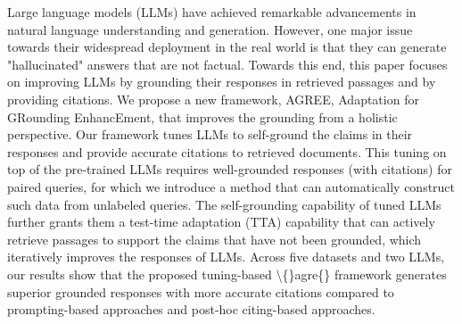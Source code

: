Large language models (LLMs) have achieved remarkable advancements in natural language understanding and generation. However, one major issue towards their widespread deployment in the real world is that they can generate "hallucinated" answers that are not factual. Towards this end, this paper focuses on improving LLMs by grounding their responses in retrieved passages and by providing citations. We propose a new framework, AGREE, Adaptation for GRounding EnhancEment, that improves the grounding from a holistic perspective. Our framework tunes LLMs to self-ground the claims in their responses and provide accurate citations to retrieved documents. This tuning on top of the pre-trained LLMs requires well-grounded responses (with citations) for paired queries, for which we introduce a method that can automatically construct such data from unlabeled queries. The self-grounding capability of tuned LLMs further grants them a test-time adaptation (TTA) capability that can actively retrieve passages to support the claims that have not been grounded, which iteratively improves the responses of LLMs. Across five datasets and two LLMs, our results show that the proposed tuning-based \textbackslash\{\}agre\{\} framework generates superior grounded responses with more accurate citations compared to prompting-based approaches and post-hoc citing-based approaches.